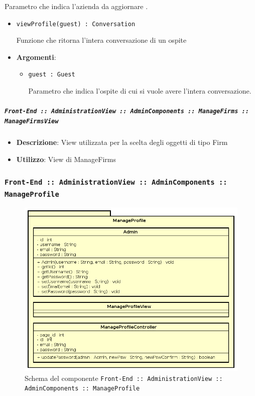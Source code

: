 \documentclass[../DefinizioneDiProdotto.tex]{subfiles}
\begin{document}
\begin{itemize}
\begin{itemize}
\begin{itemize}
\begin{itemize}
	 Parametro che indica l'azienda da aggiornare .
	\end{itemize}
	\end{itemize}\vspace{0.5em}
	\begin{itemize}
	\item \texttt{viewProfile(guest) : Conversation}\

	 Funzione che ritorna l'intera conversazione di un ospite

	\item \textbf{Argomenti}:
	\begin{itemize}
	\item \texttt{guest : Guest}\

	 Parametro che indica l'ospite di cui si vuole avere l'intera conversazione.
	\end{itemize}
	\end{itemize}\vspace{0.5em}
	\end{itemize}\subparagraph{\texttt{Front-End :: AdministrationView :: AdminComponents :: ManageFirms :: ManageFirmsView}}
	\begin{itemize}\item \textbf{Descrizione}: View utilizzata per la scelta degli oggetti di tipo Firm
	\item \textbf{Utilizzo}: View di ManageFirms
	\end{itemize}\end{itemize}

	\newpage
	\subsubsection{ \texttt{Front-End :: AdministrationView :: AdminComponents :: ManageProfile}}
		\begin{figure}[!h]
			\centering
			\includegraphics[scale=0.7]{Architettura/Front-End/Administration/AdminComponents/ManageProfile.png}
			\caption{Schema del componente \texttt{Front-End :: AdministrationView :: AdminComponents :: ManageProfile}}
		\end{figure}
\end{document}
